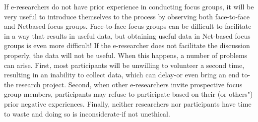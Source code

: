 \documentclass [8pt]{beamer}
\begin{document}
\begin{frame}
If e-researchers do not have prior experience in conducting focus groups, it will be very useful to introduce themselves to the process by observing both face-to-face and Netbased focus groups. Face-to-face focus groups can be difficult to facilitate in a way that results in useful data, but obtaining useful data in Net-based focus groups is even more difficult! If the e-researcher does not facilitate the discussion properly, the data will not be useful. When this happens, a number of problems can arise. First, most participants will be unwilling to volunteer a second time, resulting in an inability to collect data, which can delay-or even bring an end to-the research project. Second, when other e-researchers invite prospective focus group members, participants may refuse to participate based on their (or others") prior negative experiences. Finally, neither researchers nor participants have time to waste and doing so is inconsiderate-if not unethical. 

\end{frame}
\end{document}
